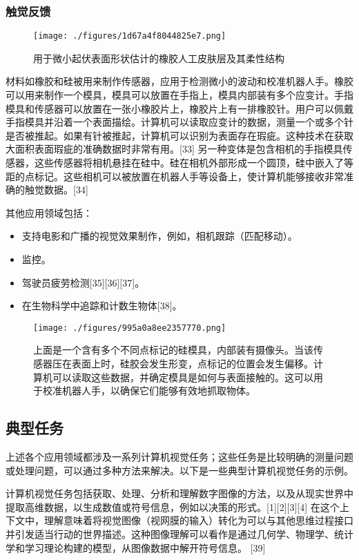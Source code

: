\subsubsection{触觉反馈}
\begin{figure}[ht]
\centering
\texttt{[image: ./figures/1d67a4f8044825e7.png]}
\caption{用于微小起伏表面形状估计的橡胶人工皮肤层及其柔性结构} \label{fig_JSJ_6}
\end{figure}
材料如橡胶和硅被用来制作传感器，应用于检测微小的波动和校准机器人手。橡胶可以用来制作一个模具，模具可以放置在手指上，模具内部装有多个应变计。手指模具和传感器可以放置在一张小橡胶片上，橡胶片上有一排橡胶针。用户可以佩戴手指模具并沿着一个表面描绘。计算机可以读取应变计的数据，测量一个或多个针是否被推起。如果有针被推起，计算机可以识别为表面存在瑕疵。这种技术在获取大面积表面瑕疵的准确数据时非常有用。[33] 另一种变体是包含相机的手指模具传感器，这些传感器将相机悬挂在硅中。硅在相机外部形成一个圆顶，硅中嵌入了等距的点标记。这些相机可以被放置在机器人手等设备上，使计算机能够接收非常准确的触觉数据。[34]

其他应用领域包括：
\begin{itemize}
\item 支持电影和广播的视觉效果制作，例如，相机跟踪（匹配移动）。
\item 监控。
\item 驾驶员疲劳检测[35][36][37]。
\item 在生物科学中追踪和计数生物体[38]。
\end{itemize}
\begin{figure}[ht]
\centering
\texttt{[image: ./figures/995a0a8ee2357770.png]}
\caption{上面是一个含有多个不同点标记的硅模具，内部装有摄像头。当该传感器压在表面上时，硅胶会发生形变，点标记的位置会发生偏移。计算机可以读取这些数据，并确定模具是如何与表面接触的。这可以用于校准机器人手，以确保它们能够有效地抓取物体。} \label{fig_JSJ_7}
\end{figure}
\subsection{典型任务}  
上述各个应用领域都涉及一系列计算机视觉任务；这些任务是比较明确的测量问题或处理问题，可以通过多种方法来解决。以下是一些典型计算机视觉任务的示例。

计算机视觉任务包括获取、处理、分析和理解数字图像的方法，以及从现实世界中提取高维数据，以生成数值或符号信息，例如以决策的形式。[1][2][3][4] 在这个上下文中，理解意味着将视觉图像（视网膜的输入）转化为可以与其他思维过程接口并引发适当行动的世界描述。这种图像理解可以看作是通过几何学、物理学、统计学和学习理论构建的模型，从图像数据中解开符号信息。 [39]

